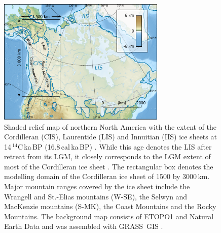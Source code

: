 \documentclass[tc, ms]{copernicus}
\begin{document}
\begin{figure}[t]
	\vspace*{2mm}
	\begin{center}
		\includegraphics[width=8cm]{cordillera-climate-locmap}
	\end{center}
	\caption{Shaded relief map of northern North America with the extent of the Cordilleran (CIS), Laurentide (LIS) and Innuitian (IIS) ice sheets at 14\,$^{14}$C\,ka\,BP (16.8\,cal\,ka\,BP) \citep{dyke-2004}. While this age denotes the LIS after retreat from its LGM, it closely corresponds to the LGM extent of most of the Cordilleran ice sheet \citep{porter-swanson-1998,dyke-2004,stroeven-etal-2010}. The rectangular box denotes the modelling domain of the Cordilleran ice sheet of 1500 by 3000\,km. Major mountain ranges covered by the ice sheet include the Wrangell and St.-Elias mountains (W-SE), the Selwyn and MacKenzie mountains (S-MK), the Coast Mountains and the Rocky Mountains. The background map consists of ETOPO1 \citep{data:etopo1} and Natural Earth Data \citep{data:naturalearth} and was assembled with GRASS~GIS \citep{soft:grass}.}
	\label{fig:locmap}
\end{figure}
\end{document}
